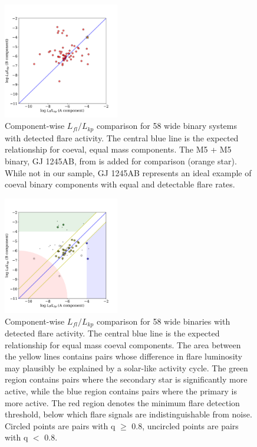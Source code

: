 \documentclass[preprint2]{aastex61}
\begin{document}
\begin{figure}[!ht]
\centering
\includegraphics[width=0.45\textwidth]{AB_v1}
\caption{Component-wise $L_{fl}/L_{kp}$ comparison for 58 wide binary systems with detected flare activity. The central blue line is the expected relationship for coeval, equal mass components. The M5 + M5 binary, GJ 1245AB, from \citet{lurie2015} is added for comparison (orange star). While not in our sample, GJ 1245AB represents an ideal example of coeval binary components with equal and detectable flare rates.
}
\label{fig:AB1}
\end{figure}


\begin{figure}[!ht]
\includegraphics[width=0.45\textwidth]{AB_v5}
\caption{Component-wise $L_{fl}/L_{kp}$ comparison for 58 wide binaries with detected flare activity. The central blue line is the expected relationship for equal mass coeval components. The area between the yellow lines contains pairs whose difference in flare luminosity may plausibly be explained by a solar-like activity cycle. The green region contains pairs where the secondary star is significantly more active, while the blue region contains pairs where the primary is more active. The red region denotes the minimum flare detection threshold, below which flare signals are indistinguishable from noise. Circled points are pairs with q $\geq$ 0.8, uncircled points are pairs with q $<$ 0.8.
}
\label{fig:highlight}
\end{figure}
\end{document}
